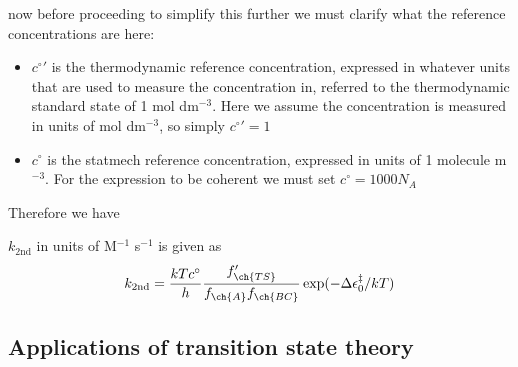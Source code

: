 now before proceeding to simplify this further we must clarify what the reference concentrations are here: 
\begin{itemize}
  \item ${c^{\circ}}' $ is the thermodynamic reference concentration, expressed in whatever units that are used to measure the concentration in, referred to the thermodynamic standard state of 1 mol dm$^{-3}$. Here we assume the concentration is measured in units of mol dm$^{-3}$, so simply ${c^{\circ}}'=1$
  \item $c^{\circ} $ is the statmech reference concentration, expressed in units of 1 molecule m$^{-3}$. For the expression to be coherent we must set $c^{\circ}=1000N_A$
\end{itemize}
Therefore we have
\begin{thrm}
\label{k2nd}
 $k_{\text{2nd}}$ in units of M$^{-1}$ s$^{-1}$ is given as 
\begin{equation}
  k_{\text{2nd}}=\frac{kTc^{\circ}}{h}\frac{f'_{\ch{TS}}}{f_{\ch{A}}f_{\ch{BC}}}\exp(-\Delta\ep_0^{\ddag}/kT)
\end{equation}
\end{thrm}
\subsection{Applications of transition state theory}
